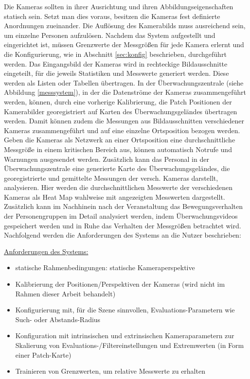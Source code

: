 Die Kameras sollten in ihrer Ausrichtung und ihren Abbildungseigenschaften statisch sein. Setzt man dies voraus, besitzen die Kameras fest definierte Anordnungen zueinander. Die Auflösung des Kamerabilds muss ausreichend sein, um einzelne Personen aufzulösen. Nachdem das System aufgestellt und eingerichtet ist, müssen Grenzwerte der Messgrößen für jede Kamera erlernt und die Konfigurierung, wie in Abschnitt \ref{sec:konfig} beschrieben, durchgeführt werden. Das Eingangsbild der Kameras wird in rechteckige Bildausschnitte eingeteilt, für die jeweils Statistiken und Messwerte generiert werden. Diese werden als Listen oder Tabellen übertragen. In der Überwachungszentrale (siehe Abbildung \ref{messsystem}), in der die Datenströme der Kameras zusammengeführt werden, können, durch eine vorherige Kalibrierung, die Patch Positionen der Kamerabilder georegistriert auf Karten des Überwachungsgeländes übertragen werden. 
\newpage
Damit können zudem die Messungen aus Bildausschnitten verschiedener Kameras zusammengeführt und auf eine einzelne Ortsposition bezogen werden. Geben die Kameras als Netzwerk an einer Ortsposition eine durchschnittliche Messgröße in einem kritischen Bereich aus, können automatisch Notrufe und Warnungen ausgesendet werden. Zusätzlich kann das Personal in der Überwachungszentrale eine generierte Karte des Überwachungsgeländes, die georegistrierte und gemittelte Messungen der versch. Kameras darstellt, analysieren. Hier werden die durchschnittlichen Messwerte der verschiedenen Kameras als Heat Map wahlweise mit angezeigten Messwerten dargestellt. Zusätzlich kann im Nachhinein nach der Veranstaltung das Bewegungsverhalten der Personengruppen im Detail analysiert werden, indem Überwachungsvideos gespeichert werden und in Ruhe das Verhalten der Messgrößen betrachtet wird.
\newpage
Nachfolgend werden die Anforderungen des Systems an die Nutzer beschrieben:

\begin{flushleft}
\underline{Anforderungen des Systems:}
\end{flushleft}
\begin{itemize}
\item statische Rahmenbedingungen: statische Kameraperspektive
\item Kalibrierung der Positionen/Perspektiven der Kameras (wird nicht im Rahmen dieser Arbeit behandelt)
\item Konfigurierung mit, für die Szene sinnvollen, Evaluations-Parametern wie Such- oder Abstands-Radius
\item Konfiguration mit intrinsischen und extrinsischen Kameraparametern zur Skalierung von Evaluations-/Filtereinstellungen und Extremwerten (\zb in Form einer Patch-Karte)
\item Trainieren von Grenzwerten, um relative Messwerte zu erhalten
\end{itemize}

